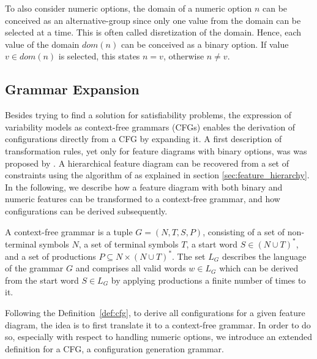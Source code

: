 To also consider numeric options, the domain of a numeric option $n$ can be
conceived as an alternative-group since only one value from the domain can be
selected at a time. This is often called disretization of the domain. Hence,
each value of the domain $dom(n)$ can be conceived as a binary option. If value $v \in dom(n)$ is selected, this states $n = v$,
otherwise $n \neq v$.


\subsection{Grammar Expansion}
Besides trying to find a solution for satisfiability problems, the expression of
variability models as context-free grammars (CFGs) enables the derivation of
configurations directly from a CFG by expanding it. A
first description of transformation rules, yet only for feature diagrams with
binary options, was was proposed by \cite{batory_feature_2005}. A hierarchical feature diagram
can be recovered from a set of constraints using the algorithm of
\cite{she_reverse_2011} as explained in section \ref{sec:feature_hierarchy}.
In the following, we describe
how a feature diagram with both binary and numeric features can be transformed
to a context-free grammar, and how configurations can be derived subsequently.

\begin{definition}\label{def:cfg}
A context-free grammar is a tuple $G = (N, T, S, P)$, consisting of a set of
non-terminal symbols $N$, a set of terminal symbols $T$, a start word $S \in (N
\cup T)^*$, and a set of productions $P \subseteq N \times (N \cup T)^*$. The
set $L_G$ describes the language of the grammar $G$ and comprises all valid
words $w \in L_G$ which can be derived from the start word $S \in L_G$ by
applying productions a finite number of times to it.
\end{definition}

Following the Definition~\ref{def:cfg}, to derive all configurations for a
given feature diagram, the idea is to first translate it to a context-free
grammar. In order to do so, especially with respect to handling numeric
options, we introduce an extended definition for a CFG, a configuration
generation grammar.

